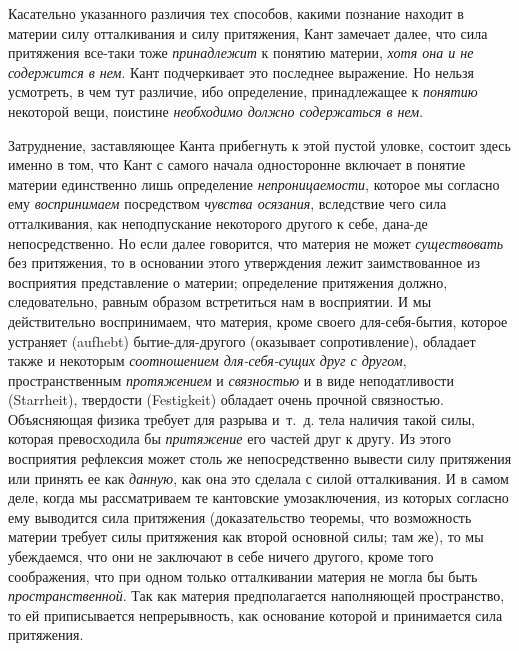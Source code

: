 Касательно указанного различия тех способов, какими познание находит в
материи силу отталкивания и силу притяжения, Кант замечает далее, что сила
притяжения все-таки тоже {\em принадлежит} к понятию
материи, {\em хотя она и не содержится в нем}. Кант
подчеркивает это последнее выражение. Но нельзя усмотреть, в чем тут
различие, ибо определение, принадлежащее к
{\em понятию} некоторой вещи, поистине
{\em необходимо должно содержаться в нем}.

Затруднение, заставляющее Канта прибегнуть к этой пустой уловке, состоит
здесь именно в том, что Кант с самого начала односторонне включает в
понятие материи единственно лишь определение
{\em непроницаемости}, которое мы согласно ему
{\em воспринимаем} посредством
{\em чувства осязания}, вследствие чего сила
отталкивания, как неподпускание некоторого другого к себе, дана-де
непосредственно. Но если далее говорится, что материя не может
{\em существовать} без притяжения, то в основании этого
утверждения лежит заимствованное из восприятия представление о материи;
определение притяжения должно, следовательно, равным образом встретиться
нам в восприятии. И мы действительно воспринимаем, что материя, кроме
своего для-себя-бытия, которое устраняет (aufhebt) бытие-для-другого
(оказывает сопротивление), обладает также и некоторым
{\em соотношением для-себя-сущих друг с другом},
пространственным {\em протяжением} и
{\em связностью} и в виде неподатливости (Starrheit),
твердости (Festigkeit) обладает очень прочной связностью. Объясняющая
физика требует для разрыва и~т.~д. тела наличия такой силы, которая
превосходила бы {\em притяжение} его частей друг к
другу. Из этого восприятия рефлексия может столь же непосредственно вывести
силу притяжения или принять ее как {\em данную}, как
она это сделала с силой отталкивания. И в самом деле, когда мы
рассматриваем те кантовские умозаключения, из которых согласно ему
выводится сила притяжения (доказательство теоремы, что возможность материи
требует силы притяжения как второй основной силы; там же), то мы
убеждаемся, что они не заключают в себе ничего другого, кроме того
соображения, что при одном только отталкивании материя не могла бы быть
{\em пространственной}. Так как материя предполагается
наполняющей пространство, то ей приписывается непрерывность, как основание
которой и принимается сила притяжения.

